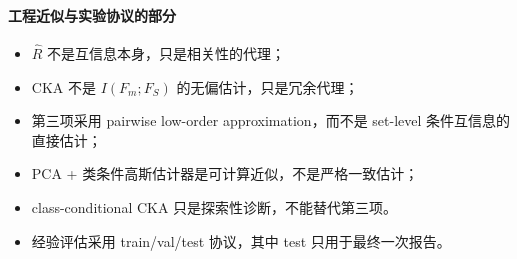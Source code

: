 \documentclass[UTF8,fontset=fandol]{ctexart}
\theoremstyle{remark}
\begin{document}
\paragraph{工程近似与实验协议的部分}
\begin{itemize}
    \item $\widehat R$ 不是互信息本身，只是相关性的代理；
    \item CKA 不是 $I(F_m; F_S)$ 的无偏估计，只是冗余代理；
    \item 第三项采用 pairwise low-order approximation，而不是 set-level 条件互信息的直接估计；
    \item PCA + 类条件高斯估计器是可计算近似，不是严格一致估计；
    \item class-conditional CKA 只是探索性诊断，不能替代第三项。
    \item 经验评估采用 train/val/test 协议，其中 test 只用于最终一次报告。
\end{itemize}
\end{document}
